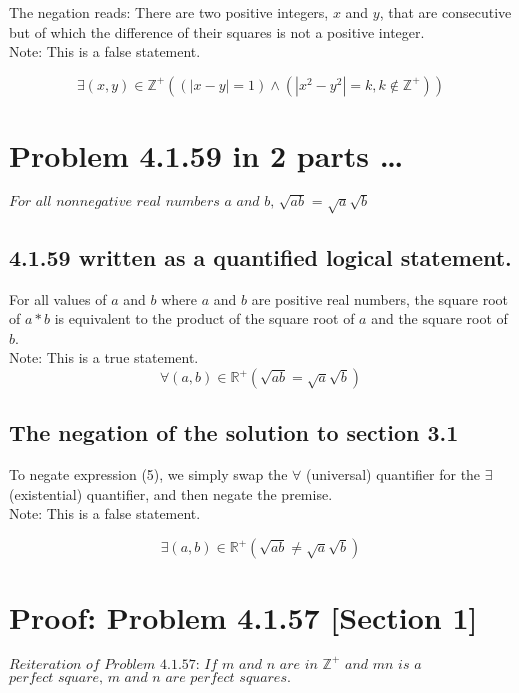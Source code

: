 \documentclass[12pt]{article}
\begin{document}
The negation reads: There are two positive integers, $x$ and $y$, that are consecutive but of which the difference of their squares is not a positive integer.\\

Note: This is a false statement.

\begin{equation}
\exists (x,y) \in \mathbb{Z}^+((|x-y| = 1) \land (|x^2 - y^2| = k, k \notin \mathbb{Z}^+))
\end{equation}

\section{Problem 4.1.59 in 2 parts \ldots}
\bigskip
$\textit{For all nonnegative real numbers $a$ and $b$, $\sqrt{ab}$ = $\sqrt{a}\sqrt{b}$}$

\subsection{4.1.59 written as a quantified logical statement.}
\bigskip

For all values of $a$ and $b$ where $a$ and $b$ are positive real numbers, the square root of $a*b$ is equivalent to the product of the square root of $a$ and the square root of $b$.\\

Note: This is a true statement.\\

\begin{equation}
\forall (a,b) \in \mathbb{R}^+ (\sqrt{ab} = \sqrt{a}\sqrt{b})
\end{equation}

\bigskip
\subsection{The negation of the solution to section 3.1}
\bigskip

To negate expression (5), we simply swap the $\forall$ (universal) quantifier for the $\exists$ (existential) quantifier, and then negate the premise.\\

Note: This is a false statement.

\begin{equation}
\exists (a,b) \in \mathbb{R}^+ (\sqrt{ab} \neq \sqrt{a}\sqrt{b})
\end{equation}

\section{Proof: Problem 4.1.57 [Section 1]}
\bigskip
$\textit{Reiteration of Problem 4.1.57: If $m$ and $n$ are in $\mathbb{Z}^+$ and $mn$ is a}$\\
$\textit{perfect square, $m$ and $n$ are perfect squares.}$ \\
\end{document}
